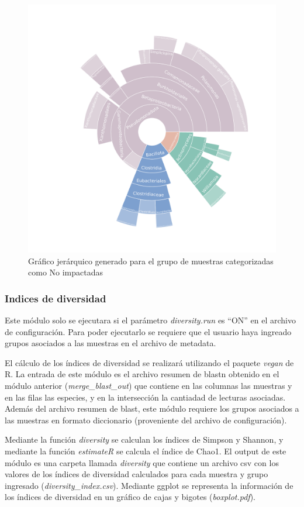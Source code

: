  \begin{figure}[H]
    \centering
    \includegraphics[width=0.9\linewidth]{images/pipeline/core_Impactadas.pdf}
    \caption{Gráfico jerárquico generado para el grupo de muestras categorizadas como No impactadas}
    \label{fig:pipeline-core}
\end{figure}

\subsubsection{Indices de diversidad}
Este módulo solo se ejecutara si el parámetro \textit{diversity.run} es ``ON'' en el archivo de configuración. 
Para poder ejecutarlo se requiere que el usuario haya ingreado grupos asociados a las muestras en el archivo de metadata.

El cálculo de los índices de diversidad se realizará utilizando el paquete \textit{vegan} de R.
La entrada de este módulo es el archivo resumen de blastn obtenido en el módulo anterior (\textit{merge\_blast\_out}) que contiene en las columnas las muestras y en las filas las especies, y  en la intersección la cantiadad de lecturas asociadas.
Además del archivo resumen de blast, este módulo requiere los grupos asociados a las muestras en formato diccionario (proveniente del archivo de configuración).

Mediante la función \textit{diversity} se calculan los índices de Simpson y Shannon, y mediante la función \textit{estimateR} se calcula el índice de Chao1.
El output de este módulo es una carpeta llamada \textit{diversity} que contiene un archivo csv con los valores de los índices de diversidad calculados para cada muestra y grupo ingresado (\textit{diversity\_index.csv}). 
Mediante ggplot se representa la información de los índices de diversidad en un gráfico de cajas y bigotes (\textit{boxplot.pdf}).

